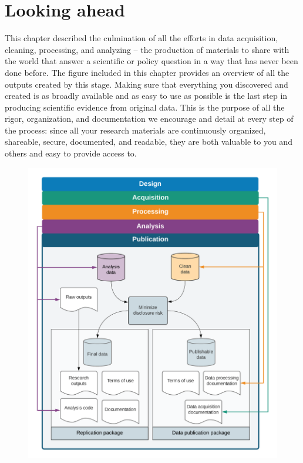 \section{Looking ahead}
This chapter described the culmination of all the efforts in data acquisition, cleaning, processing, and analyzing --
the production of materials to share with the world
that answer a scientific or policy question in a way that has
never been done before.
The figure included in this chapter provides an overview
of all the outputs created by this stage.
Making sure that everything you discovered and created
is as broadly available and as easy to use as possible
is the last step in producing scientific evidence from original data.
This is the purpose of all the rigor, organization, and documentation
we encourage and detail at every step of the process:
since all your research materials are
continuously organized, shareable, secure, documented, and readable,
they are both valuable to you and others and easy to provide access to.

\begin{fullwidth}
	\begin{figure}
		\centering
		\includegraphics[width=1.5\linewidth]{diagrams/Publication}
		\label{fig:publication}
	\end{figure}
\end{fullwidth}
